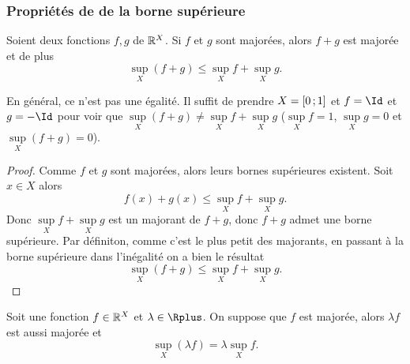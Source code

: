 \subsubsection{Propriétés de de la borne supérieure}
\begin{prop}
  Soient deux fonctions $f,g$ de $\mathbb{R}^X$. Si $f$ et $g$ sont majorées, alors $f+g$ est majorée et de plus 
  \begin{equation}
    \sup\limits_{X}(f+g) \leq \sup\limits_{X}f + \sup\limits_{X}g.
  \end{equation}
\end{prop}
En général, ce n'est pas une égalité. Il suffit de prendre $X=\left[ 0 \, ;  1 \right]$ et $f=\Id$ et $g=-\Id$ pour voir que $\sup\limits_{X}(f+g) \neq \sup\limits_{X}f + \sup\limits_{X}g$ ($\sup\limits_{X}f=1$, $\sup\limits_{X}g=0$ et $\sup\limits_{X}(f+g)=0$).
\begin{proof}
  Comme $f$ et $g$ sont majorées, alors leurs bornes supérieures existent. Soit $x \in X$ alors
  \begin{equation}
    f(x)+g(x) \leq \sup\limits_{X}f + \sup\limits_{X}g.
  \end{equation}
  Donc $\sup\limits_{X}f + \sup\limits_{X}g$ est un majorant de $f+g$, donc $f+g$ admet une borne supérieure. Par définiton, comme c'est le plus petit des majorants, en passant à la borne supérieure dans l'inégalité on a bien le résultat
  \begin{equation}
    \sup\limits_{X}(f+g) \leq \sup\limits_{X}f + \sup\limits_{X}g.
  \end{equation}
\end{proof}
\begin{prop}
  Soit une fonction $f \in \mathbb{R}^X$ et $\lambda \in \Rplus$. On suppose que $f$ est majorée, alors $\lambda f$ est aussi majorée et
  \begin{equation}
    \sup\limits_{X}(\lambda f)= \lambda \sup\limits_{X}f.
  \end{equation}
\end{prop}
